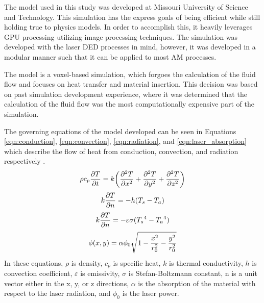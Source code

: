 \label{model_description}

The model used in this study was developed at Missouri University of Science and Technology.
This simulation has the express goals of being efficient while still holding true to physics models.  In order to accomplish this, it heavily leverages GPU processing utilizing image processing techniques.  The simulation was developed with the laser \ac{DED} processes in mind, however, it was developed in a modular manner such that it can be applied to most \ac{AM} processes. 

The model is a voxel-based simulation, which forgoes the calculation of the fluid flow and focuses on heat transfer and material insertion.  This decision was based on past simulation development experience, where it was determined that the calculation of the fluid flow was the most computationally expensive part of the simulation.   

The governing equations of the model developed can be seen in Equations \ref{eqn:conduction}, \ref{eqn:convection}, \ref{eqn:radiation}, and \ref{eqn:laser_absorption} which describe the flow of heat from conduction, convection, and radiation respectively \cite{Han2012}.
	\begin{equation}
	\label{eqn:conduction}
	\centering
	\rho c_p \frac{\partial T}{\partial t}=k \left(\frac{\partial^2 T}{\partial x^2} +\frac{\partial^2 T}{\partial y^2}+\frac{\partial^2 T}{\partial z^2} \right)
	\end{equation}
		\begin{equation}
		\label{eqn:convection}
		\centering
		k \frac{\partial T}{\partial n}=-h (T_s-T_a)
		\end{equation}
			\begin{equation}
			\label{eqn:radiation}
			\centering
			k \frac{\partial T}{\partial n}=-\varepsilon \sigma ({T_s}^4-{T_a}^4)
			\end{equation}
				\begin{equation}
				\label{eqn:laser_absorption}
				\centering
				\phi(x,y) =\alpha \phi_0 \sqrt{1-\frac{x^2}{r_0^2} -\frac{y^2}{r_0^2}}
				\end{equation}
In these equations, $\rho$ is density, $c_p$ is specific heat, $k$ is thermal conductivity, $h$ is convection coefficient, $\varepsilon$ is emissivity, $\sigma$ is Stefan-Boltzmann constant, n is a unit vector either in the x, y, or z directions, $\alpha$ is the absorption of the material with respect to the laser radiation, and $\phi_0$ is the laser power. 

